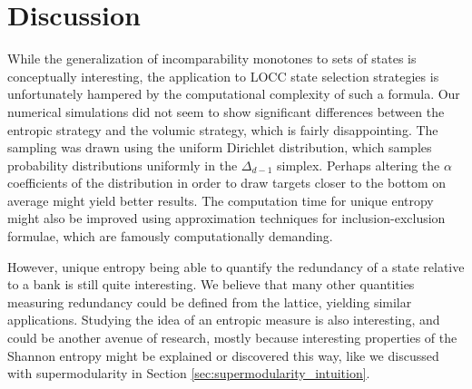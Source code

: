 \section{Discussion}

While the generalization of incomparability monotones to sets of states is conceptually interesting, the application to LOCC state selection strategies is unfortunately hampered by the computational complexity of such a formula. Our numerical simulations did not seem to show significant differences between the entropic strategy and the volumic strategy, which is fairly disappointing. The sampling was drawn using the uniform Dirichlet distribution, which samples probability distributions uniformly in the $\Delta_{d-1}$ simplex. Perhaps altering the $\alpha$ coefficients of the distribution in order to draw targets closer to the bottom on average might yield better results. The computation time for unique entropy might also be improved using approximation techniques for inclusion-exclusion formulae, which are famously computationally demanding.

However, unique entropy being able to quantify the redundancy of a state relative to a bank is still quite interesting. We believe that many other quantities measuring redundancy could be defined from the lattice, yielding similar applications. Studying the idea of an entropic measure is also interesting, and could be another avenue of research, mostly because interesting properties of the Shannon entropy might be explained or discovered this way, like we discussed with supermodularity in Section \ref{sec:supermodularity_intuition}.